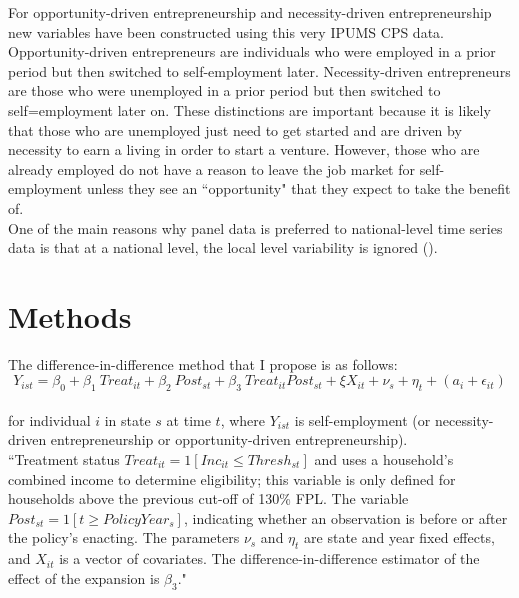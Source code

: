 \documentclass[12pt]{article}
\begin{document}
\begin{titlingpage}
For opportunity-driven entrepreneurship and necessity-driven entrepreneurship new variables have been constructed using this very IPUMS CPS data.  Opportunity-driven entrepreneurs are individuals who were employed in a prior period but then switched to self-employment later. Necessity-driven entrepreneurs are those who were unemployed in a prior period but then switched to self=employment later on. These distinctions are important because it is likely that those who are unemployed just need to get started and are driven by necessity to earn a living in order to start a venture. However, those who are already employed do not have a reason to leave the job market for self-employment unless they see an ``opportunity" that they expect to take the benefit of. 
\\ 

One of the main reasons why panel data is preferred to national-level time series data is that at a national level, the local level variability is ignored (\cite{levitt2001alternative}). \\





\section*{Methods}

The difference-in-difference method that I propose is as follows: \\

{\small 
\begin{equation}
\mathit{Y}_{ist} = \beta_0 + \beta_1 ~ \mathit{Treat}_{it} + \beta_2 ~ \mathit{Post}_{st} + \beta_3 ~ \mathit{Treat}_{it} \mathit{Post}_{st} + \xi X_{it} + \nu_s  + \eta_t + (a_i + \epsilon_{it})
\end{equation}}  \\


for individual \(i \) in state $s$ at time $t$, where $Y_{ist}$ is self-employment (or necessity-driven entrepreneurship or opportunity-driven entrepreneurship).   \\


``Treatment status $Treat_{it} = 1[Inc_{it} \leq Thresh_{st}] $ and uses a household’s combined income to determine eligibility; this variable is only defined for households above the previous cut-off of 130\% FPL. The variable $Post_{st} = 1[t \geq PolicyYear_s]$, indicating whether an observation is before or after the policy’s enacting. The parameters $\nu_s$ and $\eta_t$ are state and year fixed effects, and $X_{it}$ is a vector of
covariates. The difference-in-difference estimator of the effect of the expansion is $\beta_3$." \cite{olds2016food} 





\end{titlingpage}
\end{document}
